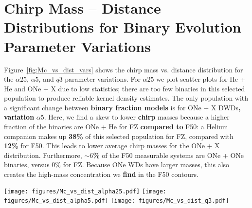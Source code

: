 \documentclass[twocolumn, linenumbers]{aastex631}
\begin{document}
\section{Chirp Mass -- Distance Distributions for Binary Evolution Parameter Variations}\label{appendix:Mc_dist_vars}

Figure~\ref{fig:Mc_vs_dist_vars} shows the chirp mass vs. distance distribution for the $\alpha25$, $\alpha5$, and $q3$ parameter variations. For $\alpha25$ we plot scatter plots for He + He and ONe + X due to low statistics; there are too few binaries in this selected population to produce reliable kernel density estimates. The only population with a significant change between \textbf{binary fraction models} is for ONe + X DWDs\textbf{, variation} $\alpha5$. Here, we find a skew to lower \textbf{chirp} masses because a higher fraction of the binaries are ONe + He for FZ \textbf{compared to} F50: a Helium companion makes up \textbf{38\%} of this selected population for FZ, compared with \textbf{12\%} for F50. This leads to lower average chirp masses for the ONe + X distribution. Furthermore, \textbf{$\sim6$\%} of the F50 measurable systems are ONe + ONe binaries, versus 0\% for FZ. Because ONe WDs have larger masses, this also creates the high-mass concentration we \textbf{find} in the F50 contours.
\begin{figure*}[h]
    \centering
	\texttt{[image: figures/Mc\_vs\_dist\_alpha25.pdf]}
	\texttt{[image: figures/Mc\_vs\_dist\_alpha5.pdf]}
	\texttt{[image: figures/Mc\_vs\_dist\_q3.pdf]}
    \caption{Chirp mass -- distance distributions for our other three binary evolution parameter variations. We plot the $\alpha25$ populations of He + He and ONe + X DWDs as scatter points since there are too few binaries to produce meaningful density distributions. Again, we have plotted each DWD type's population that exhibit observable GW frequency evolution and have $\rm{SNR}>7$. Contours show the 5$^{\rm{th}}$, 25$^{\rm{th}}$, 50$^{\rm{th}}$, 75$^{\rm{th}}$ and 95$^{\rm{th}}$ percentiles. Most populations remain unchanged between binary fraction models except for ONe + X DWDs in $\alpha5$, due to the number of He vs. CO vs. ONe companions between each model.}
    \label{fig:Mc_vs_dist_vars}
\end{figure*}
\end{document}
